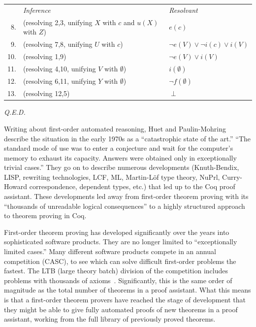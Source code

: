 \documentclass{llncs}
\begin{document}
{{\smallskip
\begin{tabular}{lll}
{\it }&{\it Inference}&{\it Resolvant}\\
~8.&(resolving 2,3, unifying $X$ with $c$ and $u(X)$ with $Z$)~~~~~&$e(c)$\\
~9.&(resolving 7,8, unifying $U$ with $c$)~~~&$\lnot e(V) \lor \lnot i(c) \lor i(V)$\\
10.&(resolving 1,9)~~~&$\lnot e(V) \lor  i(V)$\\
11.&(resolving 4,10, unifying $V$ with $\emptyset$)~~~&$i(\emptyset)$\\
12.&(resolving 6,11, unifying $Y$ with $\emptyset$)~~~&$\lnot f(\emptyset)$\\
13.&(resolving 12,5)~~~&$\perp$\\
\end{tabular}

{{\it Q.E.D.}}

}}

\newpage


Writing about first-order automated reasoning, Huet and Paulin-Mohring
\cite{Coq} describe the situation in the early 1970s as a
``catastrophic state of the art.''  ``The standard mode of use was to
enter a conjecture and wait for the computer's memory to exhaust its
capacity.  Answers were obtained only in exceptionally trivial
cases.'' 
They go on to describe numerous developments (Knuth-Bendix, LISP,
rewriting technologies, LCF, ML, Martin-L\"of type theory, NuPrl,
Curry-Howard correspondence, dependent types, etc.) that led up to the
Coq proof assistant.  These developments led away from first-order
theorem proving with its ``thousands of unreadable logical
consequences'' to a highly structured approach to theorem proving in
Coq.



First-order theorem proving has developed significantly over the years
into sophisticated software products.  They are no longer limited to
``exceptionally limited cases.''   Many different
software products compete in an annual competition (CASC), to see
which can solve difficult first-order problems the fastest.  The LTB
(large theory batch) division of the competition includes problems
with thousands of axioms~\cite{PSST}.  Significantly, this is the same order of
magnitude as the total number of theorems in a proof assistant.  What
this means is that a first-order theorem provers have reached the
stage of development that they might be able to give fully automated
proofs of new theorems in a proof assistant, working from the full
library of previously proved theorems.
\end{document}
